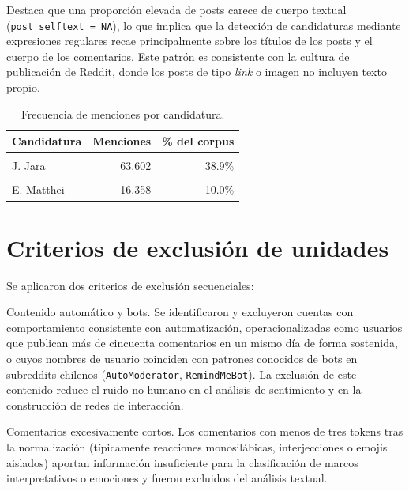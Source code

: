 \documentclass[
  letterpaper,
  numbers=noendperiod,
  fontsize=11pt,
  DIV=12,
  titlepage=false]{scrreprt}
\begin{document}
Destaca que una proporción elevada de posts carece de cuerpo textual
(\texttt{post\_selftext\ =\ NA}), lo que implica que la detección de
candidaturas mediante expresiones regulares recae principalmente sobre
los títulos de los posts y el cuerpo de los comentarios. Este patrón es
consistente con la cultura de publicación de Reddit, donde los posts de
tipo \emph{link} o imagen no incluyen texto propio.

\begin{longtable}[t]{lrr}

\caption{\label{tbl-menciones}Frecuencia de menciones por candidatura.}

\tabularnewline

\toprule
Candidatura & Menciones & \% del corpus\\
\midrule
\cellcolor{gray!10}{José A. Kast} & \cellcolor{gray!10}{102.759} & \cellcolor{gray!10}{62.8\%}\\
J. Jara & 63.602 & 38.9\%\\
\cellcolor{gray!10}{J. Kaiser} & \cellcolor{gray!10}{26.521} & \cellcolor{gray!10}{16.2\%}\\
E. Matthei & 16.358 & 10.0\%\\
\bottomrule

\end{longtable}

\section{Criterios de exclusión de
unidades}\label{criterios-de-exclusiuxf3n-de-unidades}

Se aplicaron dos criterios de exclusión secuenciales:

Contenido automático y bots. Se identificaron y excluyeron cuentas con
comportamiento consistente con automatización, operacionalizadas como
usuarios que publican más de cincuenta comentarios en un mismo día de
forma sostenida, o cuyos nombres de usuario coinciden con patrones
conocidos de bots en subreddits chilenos (\texttt{AutoModerator},
\texttt{RemindMeBot}). La exclusión de este contenido reduce el ruido no
humano en el análisis de sentimiento y en la construcción de redes de
interacción.

Comentarios excesivamente cortos. Los comentarios con menos de tres
tokens tras la normalización (típicamente reacciones monosilábicas,
interjecciones o emojis aislados) aportan información insuficiente para
la clasificación de marcos interpretativos o emociones y fueron
excluidos del análisis textual.
\end{document}
